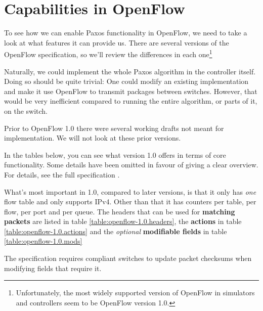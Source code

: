 \section{Capabilities in OpenFlow}


To see how we can enable Paxos functionality in OpenFlow, we need to take a
look at what features it can provide us.  There are several versions of the
OpenFlow specification, so we'll review the differences in each
one\footnote{Unfortunately, the most widely supported version of OpenFlow in
simulators and controllers seem to be OpenFlow version 1.0.}

Naturally, we could implement the whole Paxos algorithm in the controller
itself.  Doing so should be quite trivial: One could modify an existing
implementation and make it use OpenFlow to transmit packages between
switches.  However, that would be very inefficient compared to running the
entire algorithm, or parts of it, on the switch.

Prior to OpenFlow 1.0 \cite{openflow-1.0} there were several working
drafts not meant for implementation.  We will not look at these prior
versions.

In the tables below, you can see what version 1.0 offers in terms of core
functionality.  Some details have been omitted in favour of giving a clear
overview.  For details, see the full specification \cite{openflow-1.0}.

What's most important in 1.0, compared to later versions, is that it only
has {\em one} flow table and only supports IPv4.  Other than that it has
counters per table, per flow, per port and per queue.  The headers that can
be used for \textbf{matching packets} are listed in table
\ref{table:openflow-1.0.headers}, the \textbf{actions} in table
\ref{table:openflow-1.0.actions} and the {\em optional} \textbf{modifiable
  fields} in table \ref{table:openflow-1.0.mods}

The specification requires compliant switches to update packet checksums
when modifying fields that require it.

